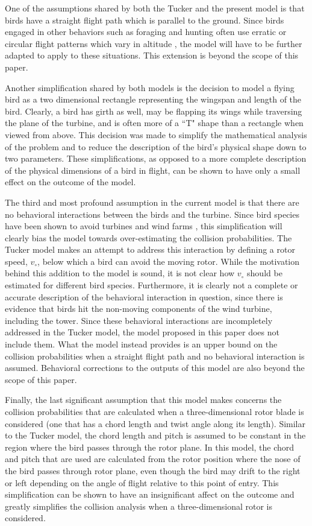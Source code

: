 \label{} \documentclass[10pt,conference]{IEEEtran}
\begin{document}
One of the assumptions shared by both the Tucker and the present model is that birds have a straight flight path which
is parallel to the ground. Since birds engaged in other behaviors such as foraging and hunting often use erratic or
circular flight patterns which vary in altitude \cite{Thalender2003}, the model will have to be further adapted to
apply to these situations. This extension is beyond the scope of this paper.

Another simplification shared by both models is the decision to model a flying bird as a two dimensional rectangle
representing the wingspan and length of the bird. Clearly, a bird has girth as well, may be flapping its wings while
traversing the plane of the turbine, and is often more of a ``T" shape than a rectangle when viewed from above. This
decision was made to simplify the mathematical analysis of the problem and to reduce the description of the bird's
physical shape down to two parameters. These simplifications, as opposed to a more complete description of the physical
dimensions of a bird in flight, can be shown to have only a small effect on the outcome of the model.

The third and most profound assumption in the current model is that there are no behavioral interactions between the
birds and the turbine. Since bird species have been shown to avoid turbines and wind farms
\cite{Kahlert2003}\cite{Chamberlain2006}, this simplification will clearly bias the model towards over-estimating the
collision probabilities. The Tucker model makes an attempt to address this interaction by defining a rotor speed,
$v_\circ$, below which a bird can avoid the moving rotor. While the motivation behind this addition to the model is
sound, it is not clear how $v_\circ$ should be estimated for different bird species. Furthermore, it is clearly not a
complete or accurate description of the behavioral interaction in question, since there is evidence that birds hit the
non-moving components of the wind turbine, including the tower. Since these behavioral interactions are incompletely
addressed in the Tucker model, the model proposed in this paper does not include them. What the model instead provides
is an upper bound on the collision probabilities when a straight flight path and no behavioral interaction is assumed.
Behavioral corrections to the outputs of this model are also beyond the scope of this paper.

Finally, the last significant assumption that this model makes concerns the collision probabilities that are calculated
when a three-dimensional rotor blade is considered (one that has a chord length and twist angle along its length).
Similar to the Tucker model, the chord length and pitch is assumed to be constant in the region where the bird passes
through the rotor plane. In this model, the chord and pitch that are used are calculated from the rotor position
where the nose of the bird passes through rotor plane, even though the bird may drift to the right or left depending
on the angle of flight relative to this point of entry. This simplification can be shown to have an insignificant
affect on the outcome and greatly simplifies the collision analysis when a three-dimensional rotor is considered.
\end{document}
